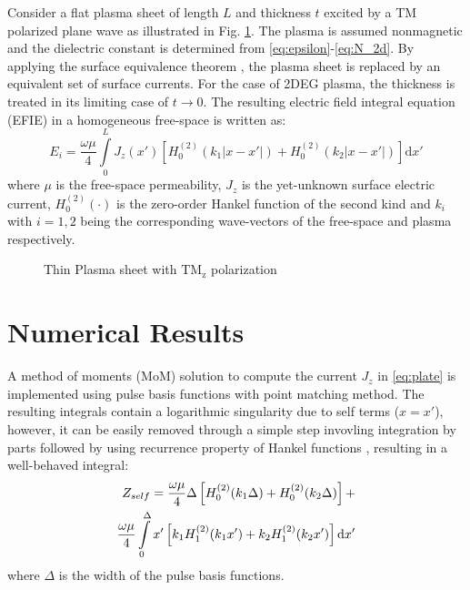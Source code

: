 \documentclass[conference, 10pt]{IEEEtran}
\renewcommand{\O}{\omega}  %
\renewcommand{\u}{\mu}  %
\renewcommand{\^}{\hat}  %
\begin{document}
Consider a flat plasma sheet of length $L$ and thickness $t$ excited by a TM polarized plane wave as illustrated in Fig. \ref{fig:plate}. The plasma is assumed nonmagnetic and the dielectric constant is determined from \eqref{eq:epsilon}-\eqref{eq:N_2d}. By applying the surface equivalence theorem \cite[p. 328-333]{balanis2012advanced}, the plasma sheet is replaced by an equivalent set of surface currents. For the case of 2DEG plasma, the thickness is treated in its limiting case of $t \to 0$. The resulting electric field integral equation (EFIE) in a homogeneous free-space is written as:
%
\begin{equation}
  E_i = \frac{\O \u}{4} \int \limits_{0}^{L} J_z(x') \left[ H_0^{(2)}(k_1 |x - x'|) + H_0^{(2)}(k_2 |x - x'|)\right] \mathrm{d}x'
  \label{eq:plate}
\end{equation}
%
where $\mu$ is the free-space permeability, $J_z$ is the yet-unknown surface electric current, $H_0^{(2)}(\cdot)$ is the zero-order Hankel function of the second kind and $k_i$ with $i = 1,2$ being the corresponding wave-vectors of the free-space and plasma respectively.
%
\begin{figure}[h]
  \normalsize
  \centering
  
  \caption{Thin Plasma sheet with $\mathrm{TM_z}$ polarization}
  \label{fig:plate}
\end{figure}
%
\section{Numerical Results}
%
A method of moments (MoM) solution to compute the current $J_z$ in \eqref{eq:plate} is implemented using pulse basis functions with point matching method. The resulting integrals contain a logarithmic singularity due to self terms ($ x = x'$), however, it can be easily removed through a simple step invovling integration by parts followed by using recurrence property of Hankel functions \cite[p. 361]{amari1995efficient,abramowitz1968handbook}, resulting in a well-behaved integral:
%
\begin{align}
  Z_{self} = \frac{\O \u}{4} \Delta \left[H_0^{(2)}(k_1 \Delta) +  H_0^{(2)}(k_2 \Delta)\right] + \notag\\
   \frac{\O \u}{4} \int \limits_{0}^{\Delta} x'\left[ k_1 H_1^{(2)}(k_1 x')  + k_2 H_1^{(2)}(k_2 x')\right] \mathrm{d}x'
  \label{eq:self}
\end{align}
%
where $\Delta$ is the width of the pulse basis functions.
%
\end{document}
